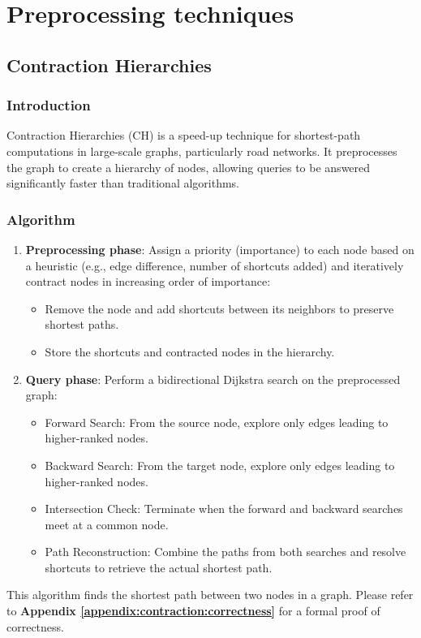 \section{Preprocessing techniques}
\subsection{Contraction Hierarchies}
	\subsubsection{Introduction}
	Contraction Hierarchies (CH) is a speed-up technique for shortest-path computations in large-scale graphs, particularly road networks. It preprocesses the graph to create a hierarchy of nodes, allowing queries to be answered significantly faster than traditional algorithms.
	\subsubsection{Algorithm}
		\begin{enumerate}
			\item \textbf{Preprocessing phase}: Assign a priority (importance) to each node based on a heuristic (e.g., edge difference, number of shortcuts added) and iteratively contract nodes in increasing order of importance:
				\begin{itemize}
					\item Remove the node and add shortcuts between its neighbors to preserve shortest paths.
					\item Store the shortcuts and contracted nodes in the hierarchy.
				\end{itemize}
			\item \textbf{Query phase}: Perform a bidirectional Dijkstra search on the preprocessed graph:
				\begin{itemize}
					\item Forward Search: From the source node, explore only edges leading to higher-ranked nodes.
					\item Backward Search: From the target node, explore only edges leading to higher-ranked nodes.
					\item Intersection Check: Terminate when the forward and backward searches meet at a common node.
					\item Path Reconstruction: Combine the paths from both searches and resolve shortcuts to retrieve the actual shortest path.
				\end{itemize}
		\end{enumerate}
	This algorithm finds the shortest path between two nodes in a graph. Please refer to \textbf{Appendix \ref{appendix:contraction:correctness}} for a formal proof of correctness.
